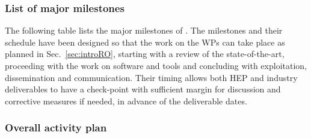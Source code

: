 %
%
%
%
\FloatBarrier
\vspace{-6mm}
\subsubsection{List of major milestones}
\label{sub:milestones}
The following table lists the major milestones of \acronym. 
The milestones and their schedule have been designed so that the work on the WPs can take place as planned in Sec.~\ref{sec:introRO}, starting with a review of the state-of-the-art, proceeding with the work on software and tools and concluding with exploitation, dissemination and communication. Their timing allows both HEP and industry deliverables to have a check-point with sufficient margin for discussion and corrective measures if needed, in advance of the deliverable dates.  


\subsubsection{Overall activity plan}

